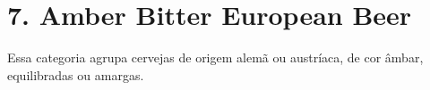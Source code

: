 \section*{7. Amber Bitter European Beer}

Essa categoria agrupa cervejas de origem alemã ou austríaca, de cor âmbar, equilibradas ou amargas.